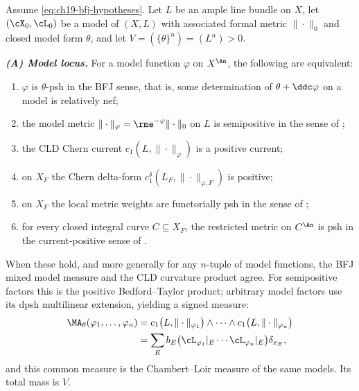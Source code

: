 \begin{theorem}
\label{thm:ch19-cld-bfj-comparison}
Assume \eqref{eq:ch19-bfj-hypotheses}.  Let $L$ be an ample line bundle on
$X$, let $(\cX_0,\cL_0)$ be a model of $(X,L)$ with associated formal
metric $\|\cdot\|_0$ and closed model form $\theta$, and let
$V=(\{\theta\}^n)=(L^n)>0$.

\emph{\textbf{(A) Model locus.}}  For a model function $\varphi$ on
$X^{\An}$, the following are equivalent:
\begin{enumerate}
\item\label{itm:ch19-cb:bfj} $\varphi$ is $\theta$-psh in the BFJ sense,
 that is, some determination of $\theta+\ddc\varphi$ on a model is
 relatively nef;
\item\label{itm:ch19-cb:zhang} the model metric
 $\|\cdot\|_\varphi=\rme^{-\varphi}\|\cdot\|_0$ on $L$ is semipositive
 in the sense of ;
\item\label{itm:ch19-cb:cld} the CLD Chern current
 $c_1(L,\|\cdot\|_\varphi)$ is a positive current;
\item\label{itm:ch19-cb:delta} on $X_F$ the Chern delta-form
 $c_1^\delta(L_F,\|\cdot\|_{\varphi,F})$ is positive;
\item\label{itm:ch19-cb:funct} on $X_F$ the local metric weights
 are functorially psh in the sense of \cite{GK19};
\item\label{itm:ch19-cb:curve} for every closed integral curve
 $C\subseteq X_F$, the restricted metric on $C^{\An}$ is psh in the
 current-positive sense of \cite{GK19}.
\end{enumerate}
When these hold, and more generally for any $n$-tuple of model functions,
the BFJ mixed model measure and the CLD curvature product agree.  For
semipositive factors this is the positive Bedford--Taylor product; arbitrary
model factors use its dpsh multilinear extension, yielding a signed measure:
\begin{equation}
\label{eq:ch19-cld-bfj-model}
 \begin{aligned}
  \MA_\theta(\varphi_1,\ldots,\varphi_n)
   &=c_1\bigl(L,\|\cdot\|_{\varphi_1}\bigr)\wedge\cdots\wedge
     c_1\bigl(L,\|\cdot\|_{\varphi_n}\bigr)\\
   &=\sum_Eb_E
     \bigl(\cL_{\varphi_1}|_E\cdots\cL_{\varphi_n}|_E\bigr)
     \delta_{x_E},
 \end{aligned}
\end{equation}
and this common measure is the Chambert--Loir measure of the same models.
Its total mass is $V$.


\end{theorem}
